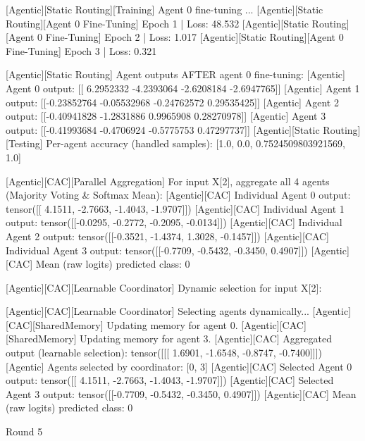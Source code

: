 [Agentic][Static Routing][Training] Agent 0 fine-tuning ...
[Agentic][Static Routing][Agent 0 Fine-Tuning] Epoch 1 | Loss: 48.532
[Agentic][Static Routing][Agent 0 Fine-Tuning] Epoch 2 | Loss: 1.017
[Agentic][Static Routing][Agent 0 Fine-Tuning] Epoch 3 | Loss: 0.321

[Agentic][Static Routing] Agent outputs AFTER agent 0 fine-tuning:
[Agentic] Agent 0 output: [[ 6.2952332 -4.2393064 -2.6208184 -2.6947765]]
[Agentic] Agent 1 output: [[-0.23852764 -0.05532968 -0.24762572  0.29535425]]
[Agentic] Agent 2 output: [[-0.40941828 -1.2831886   0.9965908   0.28270978]]
[Agentic] Agent 3 output: [[-0.41993684 -0.4706924  -0.5775753   0.47297737]]
[Agentic][Static Routing][Testing] Per-agent accuracy (handled samples): [1.0, 0.0, 0.7524509803921569, 1.0]

[Agentic][CAC][Parallel Aggregation] For input X[2], aggregate all 4 agents (Majority Voting & Softmax Mean):
[Agentic][CAC] Individual Agent 0 output: tensor([[ 4.1511, -2.7663, -1.4043, -1.9707]])
[Agentic][CAC] Individual Agent 1 output: tensor([[-0.0295, -0.2772, -0.2095, -0.0134]])
[Agentic][CAC] Individual Agent 2 output: tensor([[-0.3521, -1.4374,  1.3028, -0.1457]])
[Agentic][CAC] Individual Agent 3 output: tensor([[-0.7709, -0.5432, -0.3450,  0.4907]])
[Agentic][CAC] Mean (raw logits) predicted class: 0

[Agentic][CAC][Learnable Coordinator] Dynamic selection for input X[2]:

[Agentic][CAC][Learnable Coordinator] Selecting agents dynamically...
[Agentic][CAC][SharedMemory] Updating memory for agent 0.
[Agentic][CAC][SharedMemory] Updating memory for agent 3.
[Agentic][CAC] Aggregated output (learnable selection): tensor([[[ 1.6901, -1.6548, -0.8747, -0.7400]]])
[Agentic] Agents selected by coordinator: [0, 3]
[Agentic][CAC] Selected Agent 0 output: tensor([[ 4.1511, -2.7663, -1.4043, -1.9707]])
[Agentic][CAC] Selected Agent 3 output: tensor([[-0.7709, -0.5432, -0.3450,  0.4907]])
[Agentic][CAC] Mean (raw logits) predicted class: 0

Round 5

